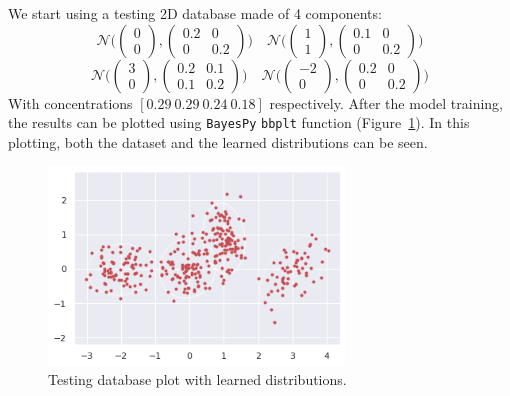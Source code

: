 We start using a testing 2D database made of 4 components:
$$
\mathcal{N}\Bigg(\begin{pmatrix} 0 \\ 0 \end{pmatrix}, \begin{pmatrix} 0.2 & 0 \\ 0 & 0.2\end{pmatrix} \Bigg) \quad \mathcal{N}\Bigg(\begin{pmatrix} 1 \\ 1 \end{pmatrix}, \begin{pmatrix} 0.1 & 0 \\ 0 & 0.2\end{pmatrix} \Bigg)
$$
$$
\mathcal{N}\Bigg(\begin{pmatrix} 3 \\ 0 \end{pmatrix}, \begin{pmatrix} 0.2 & 0.1 \\ 0.1 & 0.2\end{pmatrix} \Bigg) \quad \mathcal{N}\Bigg(\begin{pmatrix} -2 \\ 0 \end{pmatrix}, \begin{pmatrix} 0.2 & 0 \\ 0 & 0.2\end{pmatrix} \Bigg)
$$
With concentrations \([0.29\ 0.29\ 0.24\ 0.18]\) respectively. After the model training, the results can be plotted using \texttt{BayesPy} \texttt{bbplt} function (Figure~\ref{fig:mix_test_bayespy}). In this plotting, both the dataset and the learned distributions can be seen.

\begin{figure}[h!]
    \centering
    \includegraphics[width=0.7\textwidth]{tex/images/mixture_testing_bayespy.png}
    \caption{Testing database plot with learned distributions.}\label{fig:mix_test_bayespy}
\end{figure}

